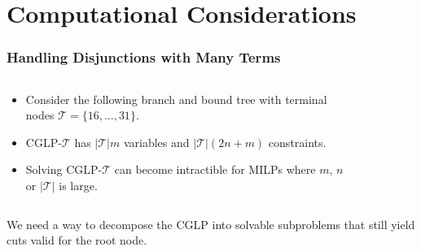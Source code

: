 \documentclass{beamer}
\begin{document}
	\section{Computational Considerations}
	
	\begin{frame}[t]
		\frametitle{Handling Disjunctions with Many Terms}
		\small
		\begin{columns}[T]
			\begin{column}{0.5\textwidth}
				\begin{itemize}
					\item Consider the following branch and bound tree with terminal nodes $ \mathcal{T} = \{16, ..., 31\}$.
					\item CGLP-$ \mathcal{T} $ has $ |\mathcal{T}|m $ variables and $ |\mathcal{T}|(2n + m) $ constraints.
					\item Solving CGLP-$ \mathcal{T} $ can become intractible for MILPs where $ m $, $ n $ or $ |\mathcal{T}| $ is large.
				\end{itemize}
			\end{column}
			\begin{column}{0.5\textwidth}
				\vspace{.75cm}
				\begin{figure}[h]
					\label{p:tree1}
				\end{figure}
			\end{column}
		\end{columns}
		\vspace{1.5cm}
		\begin{block}{}
			We need a way to decompose the CGLP into solvable subproblems that still yield cuts valid for the root node.
		\end{block}
		\normalsize
	\end{frame}
\end{document}
